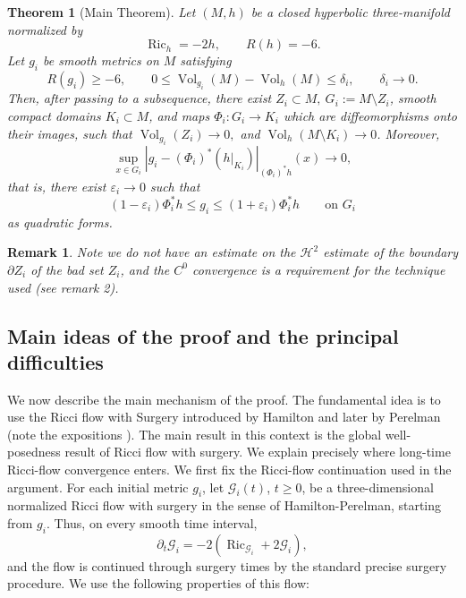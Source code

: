 \documentclass{amsart}
\newtheorem{remark}{Remark}
\newtheorem{theorem}{Theorem}[section]
\begin{document}
\begin{theorem}[Main Theorem]
\label{main1}
Let \((M,h)\) be a closed hyperbolic three-manifold normalized by
\[
        \operatorname{Ric}_{h}=-2h,
        \qquad
        R(h)=-6 .
\]
Let \(g_i\) be smooth metrics on \(M\) satisfying
\[
        R(g_i)\geq -6,
        \qquad
        0\leq
        \operatorname{Vol}_{g_i}(M)-\operatorname{Vol}_{h}(M)
        \leq \delta_i,
        \qquad
        \delta_i\to0 .
\]
Then, after passing to a subsequence, there exist 
$Z_i\subset M,~
        G_i:=M\setminus Z_i$,
smooth compact domains
$K_i\subset M$,
and maps
 $\Phi_i:G_i\longrightarrow K_i$
which are diffeomorphisms onto their images, such that
$\operatorname{Vol}_{g_i}(Z_i)\to0,
$
and
$ \operatorname{Vol}_{h}(M\setminus K_i)\to0$.
Moreover,
\[
        \sup_{x\in G_i}
        \left|
        g_i-(\Phi_i)^*(h|_{K_i})
        \right|_{(\Phi_i)^*h}(x)
        \to0,
\]
that is, there exist \(\varepsilon_i\to0\) such that
\[
        (1-\varepsilon_i)\Phi_i^*h
        \leq
        g_i
        \leq
        (1+\varepsilon_i)\Phi_i^*h
        \qquad
        \text{on }G_i 
\]
as quadratic forms.
\end{theorem}

\begin{remark}
Note we do not have an estimate on the $\mathcal{H}^{2}$ estimate of the boundary $\partial Z_{i}$ of the bad set $Z_{i}$, and the $C^{0}$ convergence is a requirement for the technique used (see remark 2). 
\end{remark}

\subsection{Main ideas of the proof and the principal difficulties}
\medskip
\noindent
We now describe the main mechanism of the proof. The fundamental idea is to use the Ricci flow with Surgery introduced by Hamilton \cite{hamilton1982three} and later by Perelman \cite{perelman2002entropy,perelman2003ricci} (note the expositions \cite{cao2006complete,kleiner2008notes}). The main result in this context is the global well-posedness result of Ricci flow with surgery. We explain precisely where long-time Ricci-flow convergence enters. We first fix the Ricci-flow continuation used in the argument.  For each
initial metric \(g_i\), let \(\mathcal G_i(t)\), \(t\geq0\), be a
three-dimensional normalized Ricci flow with surgery in the sense of
Hamilton-Perelman, starting from \(g_i\).  Thus, on every smooth time interval,
\[
        \partial_t \mathcal G_i
        =
        -2(\operatorname{Ric}_{\mathcal G_i}+2\mathcal G_i),
\]
and the flow is continued through surgery times by the standard
precise surgery procedure.  We use the following properties of
this flow:
\end{document}
